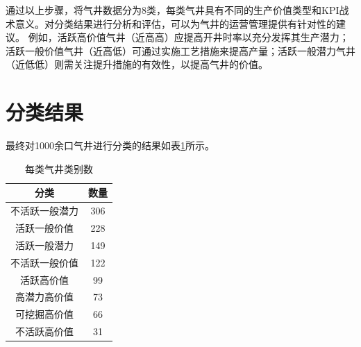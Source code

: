 通过以上步骤，将气井数据分为8类，每类气井具有不同的生产价值类型和KPI战术意义。对分类结果进行分析和评估，可以为气井的运营管理提供有针对性的建议。
例如，活跃高价值气井（近高高）应提高开井时率以充分发挥其生产潜力；活跃一般价值气井（近高低）可通过实施工艺措施来提高产量；活跃一般潜力气井（近低低）则需关注提升措施的有效性，以提高气井的价值。  
\section{分类结果}
最终对1000余口气井进行分类的结果如表\ref{fig:classtable}所示。
\begin{table}[h]
    \renewcommand{\arraystretch}{1.5}
    \centering
    \caption{每类气井类别数}
    \begin{tabular}{|c|c|}
    \hline
    分类 & 数量 \\ \hline
    不活跃一般潜力    & 306 \\ \hline
    活跃一般价值    & 228 \\ \hline
    活跃一般潜力    & 149 \\ \hline
    不活跃一般价值    & 122 \\ \hline
    活跃高价值    & 99  \\ \hline
    高潜力高价值    & 73  \\ \hline
    可挖掘高价值  & 66  \\ \hline
    不活跃高价值  & 31  \\ \hline
    \end{tabular}
    \label{fig:classtable}
\end{table}
    